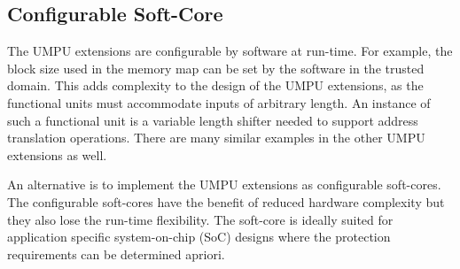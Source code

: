 \subsection{Configurable Soft-Core}
%
The UMPU extensions are
configurable by software at run-time.
%
For example, the block size used in the memory map can be set by
the software in the trusted domain.
%
This adds complexity to the design of the UMPU extensions, as the
functional units must accommodate inputs of arbitrary length.
%
An instance of such a functional unit is a variable length shifter
needed to support address translation operations.
%
There are many similar examples in the other UMPU extensions as well.

An alternative is to implement the UMPU extensions as configurable
soft-cores.
%
The configurable soft-cores have the benefit of reduced hardware
complexity but they also lose the run-time flexibility.
%
The soft-core is ideally suited for application specific
system-on-chip (SoC) designs where the protection requirements can be
determined apriori.



















